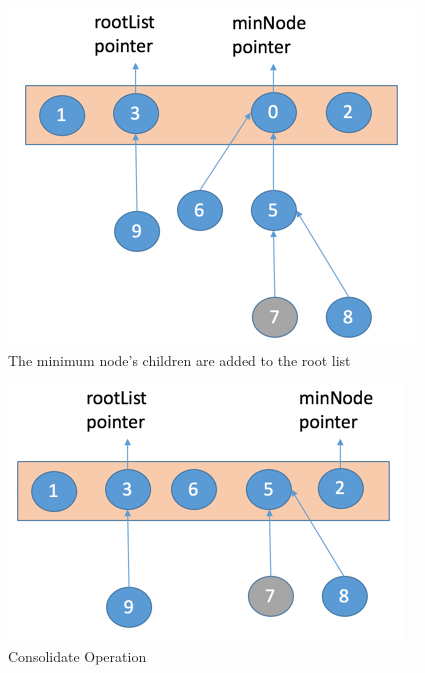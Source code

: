 \begin{figure}[h]
	\includegraphics[width=0.95\columnwidth]{Figures/FibonacciHeapStep1ExtractMinOperation}
	\caption{The minimum node's children are added to the root list}
	\label {fig:extractMin1}
\end{figure}
\begin{figure}[h]
	\includegraphics[width=0.95\columnwidth]{Figures/FibonacciHeapStep2ExtractMinOperation}
	\caption{Consolidate Operation}
	\label {fig:extractMin2}
\end{figure}
